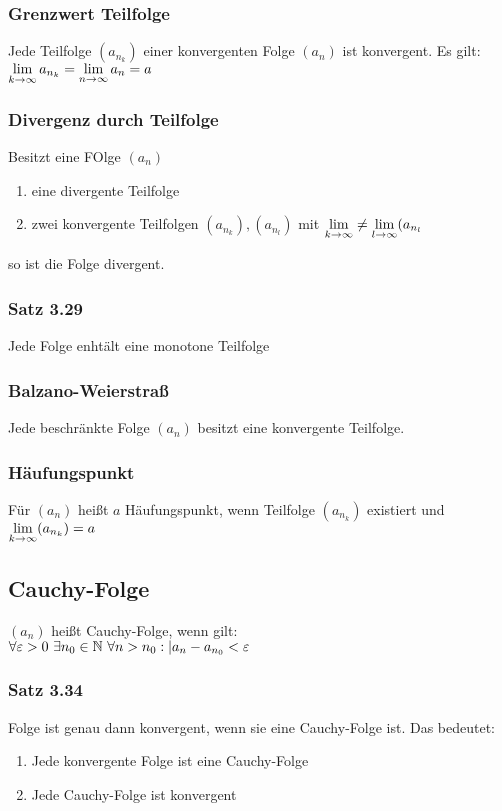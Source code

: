 \subsubsection*{Grenzwert Teilfolge}
Jede Teilfolge $(a_{n_k})$ einer konvergenten Folge $(a_n)$ ist konvergent. Es gilt: $\lim\limits_{k \rightarrow \infty} a_{n_k} = \lim\limits_{n \rightarrow \infty} a_n = a$
\subsubsection*{Divergenz durch Teilfolge}
Besitzt eine FOlge $(a_n)$
\begin{enumerate}[label=\alph*., noitemsep]
    \item eine divergente Teilfolge
    \item zwei konvergente Teilfolgen $(a_{n_k}), (a_{n_l})$ mit $\lim\limits_{k \rightarrow \infty} \neq \lim\limits_{l \rightarrow \infty} (a_{n_l}$
\end{enumerate}
so ist die Folge divergent.
\subsubsection*{Satz 3.29}
Jede Folge enhtält eine monotone Teilfolge
\subsubsection*{Balzano-Weierstraß}
Jede beschränkte Folge $(a_n)$ besitzt eine konvergente Teilfolge.
\subsubsection*{Häufungspunkt}
Für $(a_n)$ heißt $a$ Häufungspunkt, wenn Teilfolge $(a_{n_k})$ existiert und $\lim\limits_{k \rightarrow \infty} (a_{n_k}) = a$
\subsection*{Cauchy-Folge}
$(a_n)$ heißt Cauchy-Folge, wenn gilt:\\
$\forall \varepsilon > 0 \ \exists n_0 \in \mathbb N \ \forall n > n_0: |a_n - a_{n_0} < \varepsilon$
\subsubsection*{Satz 3.34}
Folge ist genau dann konvergent, wenn sie eine Cauchy-Folge ist. Das bedeutet:
\begin{enumerate}[label=\alph*., noitemsep]
    \item Jede konvergente Folge ist eine Cauchy-Folge
    \item Jede Cauchy-Folge ist konvergent
\end{enumerate}
